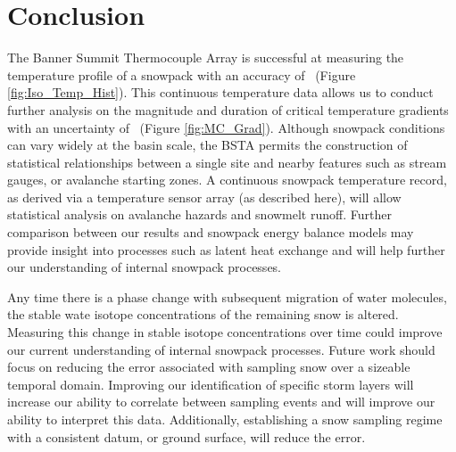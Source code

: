 \chapter{Conclusion}

The Banner Summit Thermocouple Array is successful at measuring the temperature profile of a snowpack with an accuracy of \isostd \ (Figure \ref{fig:Iso_Temp_Hist}). This continuous temperature data allows us to conduct further analysis on the magnitude and duration of critical temperature gradients with an uncertainty of \gradstd \ (Figure \ref{fig:MC_Grad}). Although snowpack conditions can vary widely at the basin scale, the BSTA permits the construction of statistical relationships between a single site and nearby features such as stream gauges, or avalanche starting zones. A continuous snowpack temperature record, as derived via a temperature sensor array (as described here), will allow statistical analysis on avalanche hazards and snowmelt runoff. Further comparison between our results and snowpack energy balance models may provide insight into processes such as latent heat exchange and will help further our understanding of internal snowpack processes. 

Any time there is a phase change with subsequent migration of water molecules, the stable wate isotope concentrations of the remaining snow is altered. Measuring this change in stable isotope concentrations over time could improve our current understanding of internal snowpack processes. Future work should focus on reducing the error associated with sampling snow over a sizeable temporal domain. Improving our identification of specific storm layers will increase our ability to correlate between sampling events and will improve our ability to interpret this data. Additionally, establishing a snow sampling regime with a consistent datum, or ground surface, will reduce the error.   